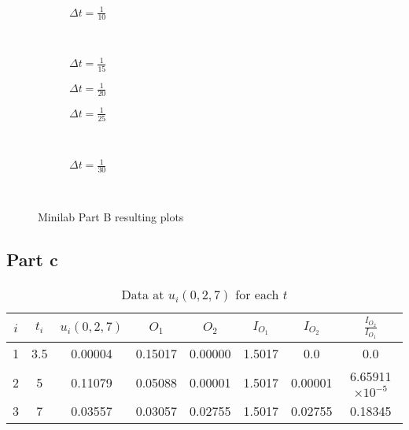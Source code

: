 \documentclass[12pt]{article}
\begin{document}
\begin{figure}[H]
  \centering
  \begin{subfigure}{.5\textwidth}
    \caption{$\Delta t=\frac{1}{10}$}
    \label{fig:mini_10}
  \end{subfigure}~
  \begin{subfigure}{.5\textwidth}
    \caption{$\Delta t=\frac{1}{15}$}
    \label{fig:mini_15}
  \end{subfigure}
  \begin{subfigure}{.5\textwidth}
    \caption{$\Delta t=\frac{1}{20}$}
    \label{fig:mini_20}
  \end{subfigure}
  \begin{subfigure}{.5\textwidth}
    \caption{$\Delta t=\frac{1}{25}$}
    \label{fig:mini_25}
  \end{subfigure}~
  \begin{subfigure}{.5\textwidth}
    \caption{$\Delta t=\frac{1}{30}$}
    \label{fig:mini_30}
  \end{subfigure}~
  \caption{Minilab Part B resulting plots}
  \label{fig:mini_c}
\end{figure}

\subsection{Part c}
\begin{table}[H]
  \centering
  \begin{tabular}[H]{cccccccc}
    \hline
    $i$ & $t_i$ & $u_i(0,2,7)$ & $O_1$ & $O_2$ & $I_{O_1}$ & $I_{O_2}$ & $\frac{I_{O_2}}{I_{O_1}}$ \\
    \hline
    1 & 3.5 & 0.00004 & 0.15017 & 0.00000 & 1.5017 & 0.0     & 0.0 \\
    2 & 5   & 0.11079 & 0.05088 & 0.00001 & 1.5017 & 0.00001 & 6.65911 $\times 10^{-5}$	\\
    3 & 7   & 0.03557 & 0.03057 & 0.02755 & 1.5017 & 0.02755 & 0.18345 \\
    \hline
  \end{tabular}
  \caption{Data at $u_i(0,2,7)$ for each $t$}
  \label{tab:mini_c_u}
\end{table}
\end{document}
